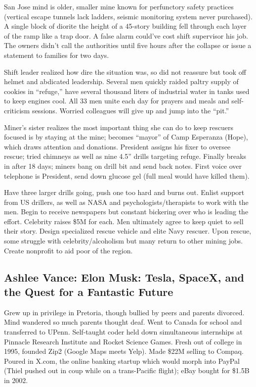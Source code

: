 \documentclass[
]{article}
\begin{document}
San Jose mind is older, smaller mine known for perfunctory safety
practices (vertical escape tunnels lack ladders, seismic monitoring
system never purchased). A single block of diorite the height of a
45-story building fell through each layer of the ramp like a trap door.
A false alarm could've cost shift supervisor his job. The owners didn't
call the authorities until five hours after the collapse or issue a
statement to families for two days.

Shift leader realized how dire the situation was, so did not reassure
but took off helmet and abdicated leadership. Several men quickly raided
paltry supply of cookies in ``refuge,'' have several thousand liters of
industrial water in tanks used to keep engines cool. All 33 men unite
each day for prayers and meals and self-criticism sessions. Worried
colleagues will give up and jump into the ``pit.''

Miner's sister realizes the most important thing she can do to keep
rescuers focused is by staying at the mine; becomes ``mayor'' of Camp
Esperanza (Hope), which draws attention and donations. President assigns
his fixer to oversee rescue; tried chimneys as well as nine 4.5'' drills
targeting refuge. Finally breaks in after 18 days; miners bang on drill
bit and send back notes. First voice over telephone is President, send
down glucose gel (full meal would have killed them).

Have three larger drills going, push one too hard and burns out. Enlist
support from US drillers, as well as NASA and psychologists/therapists
to work with the men. Begin to receive newspapers but constant bickering
over who is leading the effort. Celebrity raises \$5M for each. Men
ultimately agree to keep quiet to sell their story. Design specialized
rescue vehicle and elite Navy rescuer. Upon rescue, some struggle with
celebrity/alcoholism but many return to other mining jobs. Create
nonprofit to aid poor of the region.

\hypertarget{ashlee-vance-elon-musk-tesla-spacex-and-the-quest-for-a-fantastic-future}{%
\subsection{Ashlee Vance: Elon Musk: Tesla, SpaceX, and the Quest for a
Fantastic
Future}\label{ashlee-vance-elon-musk-tesla-spacex-and-the-quest-for-a-fantastic-future}}

Grew up in privilege in Pretoria, though bullied by peers and parents
divorced. Mind wandered so much parents thought deaf. Went to Canada for
school and transferred to UPenn. Self-taught coder held down
simultaneous internships at Pinnacle Research Institute and Rocket
Science Games. Fresh out of college in 1995, founded Zip2 (Google Maps
meets Yelp). Made \$22M selling to Compaq. Poured in X.com, the online
banking startup which would morph into PayPal (Thiel pushed out in coup
while on a trans-Pacific flight); eBay bought for \$1.5B in 2002.
\end{document}
